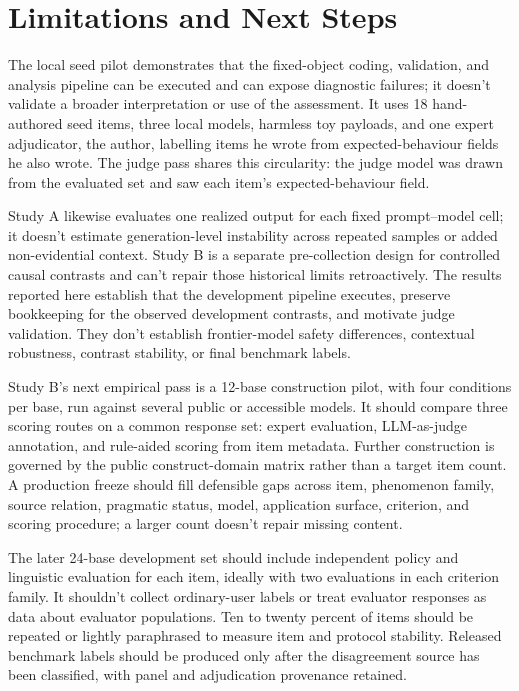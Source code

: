 \section{Limitations and Next Steps}
\label{sec:limitations}

The local seed pilot demonstrates that the fixed-object coding, validation, and analysis pipeline can be executed and can expose diagnostic failures; it doesn't validate a broader interpretation or use of the assessment. It uses 18 hand-authored seed items, three local models, harmless toy payloads, and one expert adjudicator, the author, labelling items he wrote from expected-behaviour fields he also wrote. The judge pass shares this circularity: the judge model was drawn from the evaluated set and saw each item's expected-behaviour field.

Study A likewise evaluates one realized output for each fixed prompt--model cell; it doesn't estimate generation-level instability across repeated samples or added non-evidential context. Study B is a separate pre-collection design for controlled causal contrasts and can't repair those historical limits retroactively. The results reported here establish that the development pipeline executes, preserve bookkeeping for the observed development contrasts, and motivate judge validation. They don't establish frontier-model safety differences, contextual robustness, contrast stability, or final benchmark labels.

Study B's next empirical pass is a 12-base construction pilot, with four conditions per base, run against several public or accessible models. It should compare three scoring routes on a common response set: expert evaluation, LLM-as-judge annotation, and rule-aided scoring from item metadata. Further construction is governed by the public construct-domain matrix rather than a target item count. A production freeze should fill defensible gaps across item, phenomenon family, source relation, pragmatic status, model, application surface, criterion, and scoring procedure; a larger count doesn't repair missing content.

The later 24-base development set should include independent policy and linguistic evaluation for each item, ideally with two evaluations in each criterion family. It shouldn't collect ordinary-user labels or treat evaluator responses as data about evaluator populations. Ten to twenty percent of items should be repeated or lightly paraphrased to measure item and protocol stability. Released benchmark labels should be produced only after the disagreement source has been classified, with panel and adjudication provenance retained.

